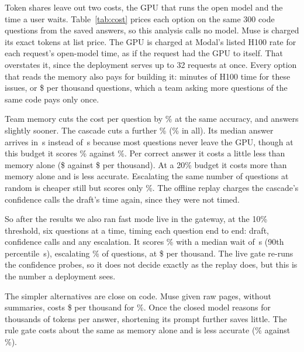 \documentclass[10pt,twocolumn]{article}
\begin{document}
Token shares leave out two costs, the GPU that runs the open model and the time a user waits. Table~\ref{tab:cost} prices each option on the same 300 code questions from the saved answers, so this analysis calls no model. Muse is charged its exact tokens at list price. The GPU is charged at Modal's listed H100 rate for each request's open-model time, as if the request had the GPU to itself. That overstates it, since the deployment serves up to 32 requests at once. Every option that reads the memory also pays for building it: \buildMinutesSwe{} minutes of H100 time for these issues, or \$\buildUsdSwe{} per thousand questions, which a team asking more questions of the same code pays only once.

Team memory cuts the cost per question by \dropMemory\% at the same accuracy, and answers slightly sooner. The cascade cuts a further \dropCascadeMemory\% (\dropCascade\% in all). Its median answer arrives in \medCascade\,s instead of \medMemory\,s because most questions never leave the GPU, though at this budget it scores \cascadeSwe\% against \accSweCompact\%. Per correct answer it costs a little less than memory alone (\$\usdOkCascade{} against \$\usdOkMemory{} per thousand). At a 20\% budget it costs more than memory alone and is less accurate. Escalating the same number of questions at random is cheaper still but scores only \accRandomCount\%. The offline replay charges the cascade's confidence calls the draft's time again, since they were not timed.

So after the results we also ran fast mode live in the gateway, at the 10\% threshold, six questions at a time, timing each question end to end: draft, confidence calls and any escalation. It scores \accLive\% with a median wait of \liveMedian\,s (90th percentile \liveNinety\,s), escalating \liveEscalated\% of questions, at \$\liveUsd{} per thousand. The live gate re-runs the confidence probes, so it does not decide exactly as the replay does, but this is the number a deployment sees.

The simpler alternatives are close on code. Muse given raw pages, without summaries, costs \$\usdRaw{} per thousand for \accSweRaw\%. Once the closed model reasons for thousands of tokens per answer, shortening its prompt further saves little. The rule gate costs about the same as memory alone and is less accurate (\accSweRule\% against \accSweCompact\%).
\end{document}
